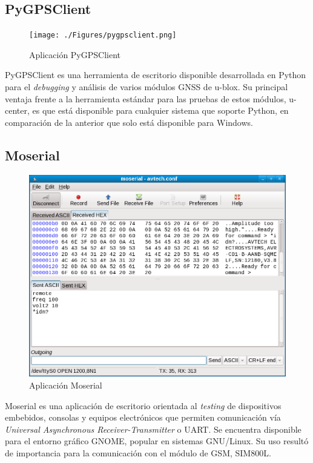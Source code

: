 \subsection{PyGPSClient}

\begin{figure}[H]
	\centering
	\texttt{[image: ./Figures/pygpsclient.png]}
	\caption{Aplicación PyGPSClient}
	\label{fig:texmaker}
\end{figure}

PyGPSClient es una herramienta de escritorio disponible desarrollada en Python para el \textit{debugging} y análisis de varios módulos GNSS de u-blox. Su principal ventaja frente a la herramienta estándar para las pruebas de estos módulos, u-center, es que está disponible para cualquier sistema que soporte Python, en comparación de la anterior que solo está disponible para Windows\citep{PYGPSCLIENT:1}.

\subsection{Moserial}

\begin{figure}[H]
	\centering
	\includegraphics[width=.9\textwidth]{./Figures/moserial.png}
	\caption{Aplicación Moserial}
	\label{fig:texmaker}
\end{figure}

Moserial es una aplicación de escritorio orientada al \textit{testing} de dispositivos embebidos, consolas y equipos electrónicos que permiten comunicación vía \textit{Universal Asynchronous Receiver-Transmitter} o UART. Se encuentra disponible para el entorno gráfico GNOME, popular en sistemas GNU/Linux. Su uso resultó de importancia para la comunicación con el módulo de GSM, SIM800L.

